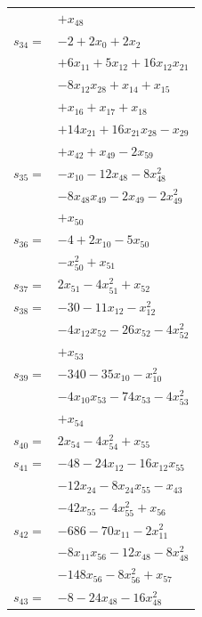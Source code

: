 \begin{longtable}{@{}r@{\;}l@{}}
 & \(\displaystyle +x_{48}\) \\[3pt]
\(s_{34}=\) & \(\displaystyle -2 +2x_{0} +2x_{2}\) \\
 & \(\displaystyle +6x_{11} +5x_{12} +16x_{12}x_{21}\) \\
 & \(\displaystyle -8x_{12}x_{28} +x_{14} +x_{15}\) \\
 & \(\displaystyle +x_{16} +x_{17} +x_{18}\) \\
 & \(\displaystyle +14x_{21} +16x_{21}x_{28} -x_{29}\) \\
 & \(\displaystyle +x_{42} +x_{49} -2x_{59}\) \\[3pt]
\(s_{35}=\) & \(\displaystyle -x_{10} -12x_{48} -8x_{48}^{2}\) \\
 & \(\displaystyle -8x_{48}x_{49} -2x_{49} -2x_{49}^{2}\) \\
 & \(\displaystyle +x_{50}\) \\[3pt]
\(s_{36}=\) & \(\displaystyle -4 +2x_{10} -5x_{50}\) \\
 & \(\displaystyle -x_{50}^{2} +x_{51}\) \\[3pt]
\(s_{37}=\) & \(\displaystyle 2x_{51} -4x_{51}^{2} +x_{52}\) \\[3pt]
\(s_{38}=\) & \(\displaystyle -30 -11x_{12} -x_{12}^{2}\) \\
 & \(\displaystyle -4x_{12}x_{52} -26x_{52} -4x_{52}^{2}\) \\
 & \(\displaystyle +x_{53}\) \\[3pt]
\(s_{39}=\) & \(\displaystyle -340 -35x_{10} -x_{10}^{2}\) \\
 & \(\displaystyle -4x_{10}x_{53} -74x_{53} -4x_{53}^{2}\) \\
 & \(\displaystyle +x_{54}\) \\[3pt]
\(s_{40}=\) & \(\displaystyle 2x_{54} -4x_{54}^{2} +x_{55}\) \\[3pt]
\(s_{41}=\) & \(\displaystyle -48 -24x_{12} -16x_{12}x_{55}\) \\
 & \(\displaystyle -12x_{24} -8x_{24}x_{55} -x_{43}\) \\
 & \(\displaystyle -42x_{55} -4x_{55}^{2} +x_{56}\) \\[3pt]
\(s_{42}=\) & \(\displaystyle -686 -70x_{11} -2x_{11}^{2}\) \\
 & \(\displaystyle -8x_{11}x_{56} -12x_{48} -8x_{48}^{2}\) \\
 & \(\displaystyle -148x_{56} -8x_{56}^{2} +x_{57}\) \\[3pt]
\(s_{43}=\) & \(\displaystyle -8 -24x_{48} -16x_{48}^{2}\) \\

\end{longtable}
